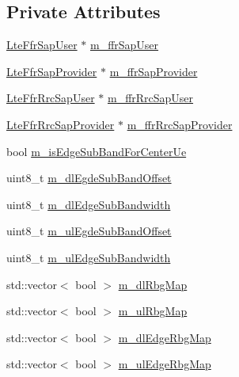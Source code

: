 \subsection*{Private Attributes}
\begin{DoxyCompactItemize}
\item 
\hyperlink{classns3_1_1LteFfrSapUser}{Lte\+Ffr\+Sap\+User} $\ast$ \hyperlink{classns3_1_1LteFrSoftAlgorithm_a2e5f4314f2d23b3001165744e9ded744}{m\+\_\+ffr\+Sap\+User}
\item 
\hyperlink{classns3_1_1LteFfrSapProvider}{Lte\+Ffr\+Sap\+Provider} $\ast$ \hyperlink{classns3_1_1LteFrSoftAlgorithm_afc0206fad5d1ac2c87349c14d02831fc}{m\+\_\+ffr\+Sap\+Provider}
\item 
\hyperlink{classns3_1_1LteFfrRrcSapUser}{Lte\+Ffr\+Rrc\+Sap\+User} $\ast$ \hyperlink{classns3_1_1LteFrSoftAlgorithm_a99a311e3fb7c3ddadc87cff09a5e7378}{m\+\_\+ffr\+Rrc\+Sap\+User}
\item 
\hyperlink{classns3_1_1LteFfrRrcSapProvider}{Lte\+Ffr\+Rrc\+Sap\+Provider} $\ast$ \hyperlink{classns3_1_1LteFrSoftAlgorithm_a6a9bc2141a95bca4a765e4320ddc0609}{m\+\_\+ffr\+Rrc\+Sap\+Provider}
\item 
bool \hyperlink{classns3_1_1LteFrSoftAlgorithm_ae11d5bba9caaedec48fed73a7d9e2ef6}{m\+\_\+is\+Edge\+Sub\+Band\+For\+Center\+Ue}
\item 
uint8\+\_\+t \hyperlink{classns3_1_1LteFrSoftAlgorithm_aadc9197fbe96b51bc0299fe0e3529523}{m\+\_\+dl\+Egde\+Sub\+Band\+Offset}
\item 
uint8\+\_\+t \hyperlink{classns3_1_1LteFrSoftAlgorithm_a0111325549d53fc66f51f1df6e88e90b}{m\+\_\+dl\+Edge\+Sub\+Bandwidth}
\item 
uint8\+\_\+t \hyperlink{classns3_1_1LteFrSoftAlgorithm_a10b3660c54a8f9f05f05708509283f11}{m\+\_\+ul\+Egde\+Sub\+Band\+Offset}
\item 
uint8\+\_\+t \hyperlink{classns3_1_1LteFrSoftAlgorithm_a32a47126b3423faab9941788f5ea78a3}{m\+\_\+ul\+Edge\+Sub\+Bandwidth}
\item 
std\+::vector$<$ bool $>$ \hyperlink{classns3_1_1LteFrSoftAlgorithm_a0e58fbca2b47a5140238ae1ef8401fd9}{m\+\_\+dl\+Rbg\+Map}
\item 
std\+::vector$<$ bool $>$ \hyperlink{classns3_1_1LteFrSoftAlgorithm_a9fad0a48f5d20e7da764a09784df488d}{m\+\_\+ul\+Rbg\+Map}
\item 
std\+::vector$<$ bool $>$ \hyperlink{classns3_1_1LteFrSoftAlgorithm_ac6fb5521c5f714cfc2d68956be8158fb}{m\+\_\+dl\+Edge\+Rbg\+Map}
\item 
std\+::vector$<$ bool $>$ \hyperlink{classns3_1_1LteFrSoftAlgorithm_a2fb979cb138971a92049045d1a287825}{m\+\_\+ul\+Edge\+Rbg\+Map}

\end{DoxyCompactItemize}
